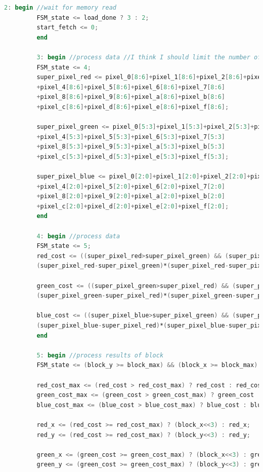 \documentclass{article}
\begin{document}
\begin{lstlisting}[language=Verilog]
		 2: begin //wait for memory read
		 FSM_state <= load_done ? 3 : 2;
		 start_fetch <= 0;
		 end
		 
		 3: begin //process data //I think I should limit the number of cascaded adds?
		 FSM_state <= 4;
		 super_pixel_red <= pixel_0[8:6]+pixel_1[8:6]+pixel_2[8:6]+pixel_3[8:6]
		 +pixel_4[8:6]+pixel_5[8:6]+pixel_6[8:6]+pixel_7[8:6]
		 +pixel_8[8:6]+pixel_9[8:6]+pixel_a[8:6]+pixel_b[8:6]
		 +pixel_c[8:6]+pixel_d[8:6]+pixel_e[8:6]+pixel_f[8:6];
		 
		 super_pixel_green <= pixel_0[5:3]+pixel_1[5:3]+pixel_2[5:3]+pixel_3[5:3]
		 +pixel_4[5:3]+pixel_5[5:3]+pixel_6[5:3]+pixel_7[5:3]
		 +pixel_8[5:3]+pixel_9[5:3]+pixel_a[5:3]+pixel_b[5:3]
		 +pixel_c[5:3]+pixel_d[5:3]+pixel_e[5:3]+pixel_f[5:3];
		 
		 super_pixel_blue <= pixel_0[2:0]+pixel_1[2:0]+pixel_2[2:0]+pixel_3[2:0]
		 +pixel_4[2:0]+pixel_5[2:0]+pixel_6[2:0]+pixel_7[2:0] 
		 +pixel_8[2:0]+pixel_9[2:0]+pixel_a[2:0]+pixel_b[2:0]
		 +pixel_c[2:0]+pixel_d[2:0]+pixel_e[2:0]+pixel_f[2:0];
		 end
		 
		 4: begin //process data
		 FSM_state <= 5;
		 red_cost <= ((super_pixel_red>super_pixel_green) && (super_pixel_red>super_pixel_blue)) ?
		 (super_pixel_red-super_pixel_green)*(super_pixel_red-super_pixel_blue) : 0;
		 
		 green_cost <= ((super_pixel_green>super_pixel_red) && (super_pixel_green>super_pixel_blue)) ?
		 (super_pixel_green-super_pixel_red)*(super_pixel_green-super_pixel_blue) : 0;
		 
		 blue_cost <= ((super_pixel_blue>super_pixel_green) && (super_pixel_blue>super_pixel_red)) ?
		 (super_pixel_blue-super_pixel_red)*(super_pixel_blue-super_pixel_green) : 0;
		 end
		 		 
		 5: begin //process results of block
		 FSM_state <= (block_y >= block_max) && (block_x >= block_max) ? 6 : 1;
		 
		 red_cost_max <= (red_cost > red_cost_max) ? red_cost : red_cost_max;
		 green_cost_max <= (green_cost > green_cost_max) ? green_cost : green_cost_max;
		 blue_cost_max <= (blue_cost > blue_cost_max) ? blue_cost : blue_cost_max;
		 
		 red_x <= (red_cost >= red_cost_max) ? (block_x<<3) : red_x;
		 red_y <= (red_cost >= red_cost_max) ? (block_y<<3) : red_y;
		 
		 green_x <= (green_cost >= green_cost_max) ? (block_x<<3) : green_x;
		 green_y <= (green_cost >= green_cost_max) ? (block_y<<3) : green_y;
		 

\end{lstlisting}
\end{document}
